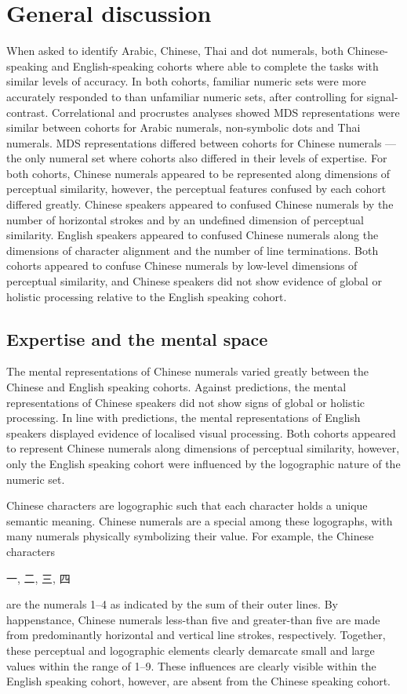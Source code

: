 \section{General discussion}
When asked to identify Arabic, Chinese, Thai and dot numerals, both Chinese-speaking and English-speaking cohorts where able to complete the tasks with similar levels of accuracy. In both cohorts, familiar numeric sets were more accurately responded to than unfamiliar numeric sets, after controlling for signal-contrast. Correlational and procrustes analyses showed MDS representations were similar between cohorts for Arabic numerals, non-symbolic dots and Thai numerals. MDS representations differed between cohorts for Chinese numerals --- the only numeral set where cohorts also differed in their levels of expertise. For both cohorts, Chinese numerals appeared to be represented along dimensions of perceptual similarity, however, the perceptual features confused by each cohort differed greatly. Chinese speakers appeared to confused Chinese numerals by the number of horizontal strokes and by an undefined dimension of perceptual similarity. English  speakers appeared to confused Chinese numerals along the dimensions of character alignment and the number of line terminations. Both cohorts appeared to confuse Chinese numerals by low-level dimensions of perceptual similarity, and Chinese speakers did not show evidence of global or holistic processing relative to the English speaking cohort. 

\subsection{Expertise and the mental space}
The mental representations of Chinese numerals varied greatly between the Chinese and English speaking cohorts. Against predictions, the mental representations of Chinese speakers did not show signs of global or holistic processing. In line with predictions, the mental representations of English speakers displayed evidence of localised visual processing. Both cohorts appeared to represent Chinese numerals along dimensions of perceptual similarity, however, only the English speaking cohort were influenced by the logographic nature of the numeric set.

Chinese characters are logographic such that each character holds a unique semantic meaning. Chinese numerals are a special among these logographs, with many numerals physically symbolizing their value. For example, the Chinese characters \begin{CJK}{UTF8}{gbsn} 一, 二, 三, 四 \end{CJK} are the numerals 1--4 as indicated by the sum of their outer lines. By happenstance, Chinese numerals less-than five and greater-than five are made from predominantly horizontal and vertical line strokes, respectively. Together, these perceptual and logographic elements clearly demarcate small and large values within the range of 1--9. These influences are clearly visible within the English speaking cohort, however, are absent from the Chinese speaking cohort. 

